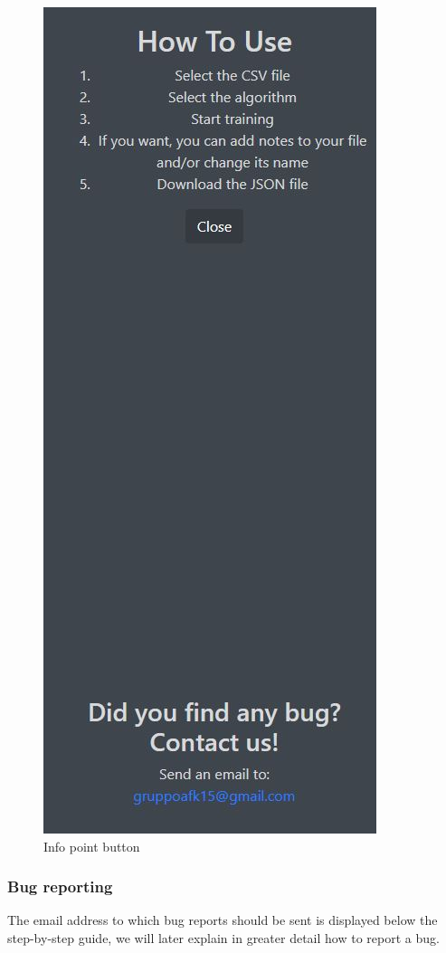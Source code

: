 \begin{figure}[H]
\centering
\includegraphics[scale=0.65]{img/tool/screen_info_tool_2.JPG}
\caption{Info point button}
\end{figure} 

\subsubsection{Bug reporting}
The email address to which bug reports should be sent is displayed below the step-by-step guide, we will later explain in greater detail how to report a bug.

